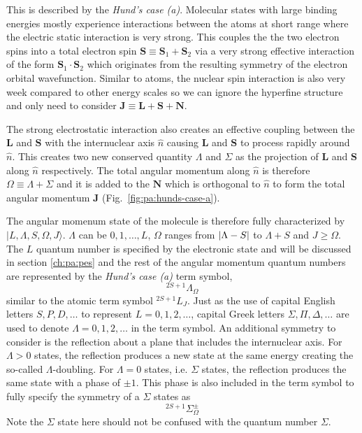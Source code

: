 This is described by the \textit{Hund's case (a)}\cite[p.~523-626]{bransden_physics_2003}.
Molecular states with large binding energies mostly experience interactions
between the atoms at short range where the electric static interaction is very strong.
This couples the the two electron spins into a total electron spin
$\mathbf{S}\equiv\mathbf{S}_1+\mathbf{S}_2$ via a very strong effective interaction
of the form $\mathbf{S}_1\cdot\mathbf{S}_2$ which originates
from the resulting symmetry of the electron orbital wavefunction.
Similar to atoms, the nuclear spin interaction is also very week compared to
other energy scales so we can ignore the hyperfine structure and only need to consider
$\mathbf{J}\equiv\mathbf{L}+\mathbf{S}+\mathbf{N}$.

The strong electrostatic interaction also creates an effective coupling
between the $\mathbf{L}$ and $\mathbf{S}$ with the internuclear axis $\hat{n}$
causing $\mathbf{L}$ and $\mathbf{S}$ to process rapidly around $\hat{n}$.
This creates two new conserved quantity $\Lambda$ and $\Sigma$
as the projection of $\mathbf{L}$ and $\mathbf{S}$
along $\hat{n}$ respectively.
The total angular momentum along $\hat{n}$ is therefore $\Omega\equiv\Lambda+\Sigma$
and it is added to the $\mathbf{N}$ which is orthogonal to $\hat{n}$ to form
the total angular momentum $\mathbf{J}$ (Fig.~\ref{fig:pa:hunds-case-a}).

The angular momenum state of the molecule is therefore fully characterized by
$|L,\Lambda,S,\Omega,J\rangle$. $\Lambda$ can be $0,1,\dots,L$, $\Omega$ ranges from
${\left|{\Lambda-S}\right|}$ to $\Lambda+S$ and $J\geqslant\Omega$.
The $L$ quantum number is specified by the electronic state and will be discussed
in section \ref{ch:pa:pes} and the rest of the angular momentum quantum numbers
are represented by the \textit{Hund's case (a)} term symbol,
\[ ^{2S+1}\Lambda_\Omega \]
similar to the atomic term symbol $^{2S+1}L_J$.
Just as the use of capital English letters $S,P,D,\dots$ to represent
$L=0,1,2,\dots$, capital Greek letters $\Sigma,\Pi,\Delta,\dots$ are used
to denote $\Lambda=0,1,2,\dots$ in the term symbol.
An additional symmetry to consider is the reflection about a plane that includes
the internuclear axis.
For $\Lambda>0$ states, the reflection produces a new state at the same energy
creating the so-called $\Lambda$-doubling. For $\Lambda=0$ states, i.e. $\Sigma$ states,
the reflection produces the same state with a phase of $\pm1$.
This phase is also included in the term symbol to fully specify the symmetry of
a $\Sigma$ states as
\[ ^{2S+1}\Sigma_\Omega^{\pm} \]
Note the $\Sigma$ state here should not be confused with the quantum number $\Sigma$.

